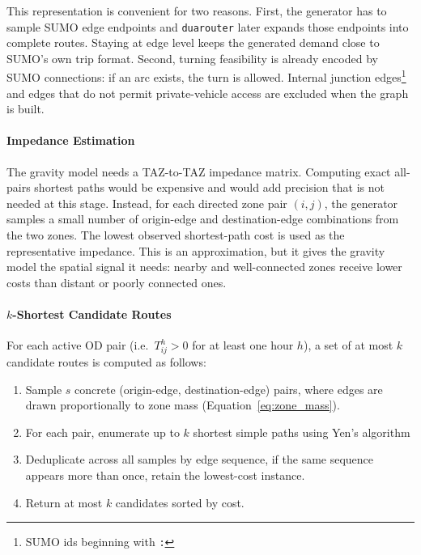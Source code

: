 This representation is convenient for two reasons. First, the generator has to
sample SUMO edge endpoints and \texttt{duarouter} later expands those
endpoints into complete routes. Staying at edge level keeps the generated
demand close to SUMO's own trip format. Second, turning feasibility is already
encoded by SUMO connections: if an arc exists, the turn is allowed. Internal
junction edges\footnote{SUMO ids beginning with \texttt{:}} and edges that do
not permit private-vehicle access are excluded when the graph is built.


\paragraph{Impedance Estimation}
\label{par:impedance_estimation}

The gravity model needs a TAZ-to-TAZ impedance matrix. Computing exact
all-pairs shortest paths would be expensive and would add precision that is
not needed at this stage. Instead, for each directed zone pair $(i,j)$, the
generator samples a small number of origin-edge and destination-edge
combinations from the two zones. The lowest observed shortest-path cost is
used as the representative impedance. This is an approximation, but it gives
the gravity model the spatial signal it needs: nearby and well-connected zones
receive lower costs than distant or poorly connected ones.

\paragraph{$k$-Shortest Candidate Routes}
\label{par:k_shortest_candidate_routes}

For each active OD pair (i.e.\ $T^h_{ij} > 0$ for at least one hour $h$),
a set of at most $k$ candidate routes is computed as follows:
\begin{enumerate}
  \item Sample $s$ concrete (origin-edge, destination-edge)
        pairs, where edges are drawn proportionally to zone mass
        (Equation~\eqref{eq:zone_mass}).
  \item For each pair, enumerate up to $k$ shortest simple paths using
        Yen's algorithm \cite{yen_algorithm}
  \item Deduplicate across all samples by edge sequence, if the same
        sequence appears more than once, retain the lowest-cost
        instance.
  \item Return at most $k$ candidates sorted by cost.
\end{enumerate}

